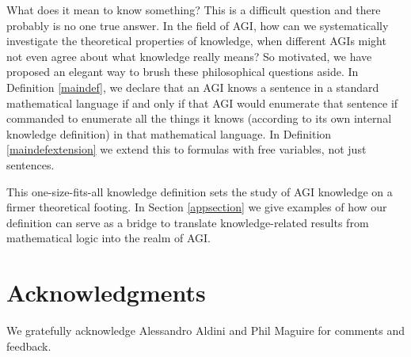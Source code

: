 \documentclass[runningheads]{llncs}
\begin{document}
What does it mean to know something? This is a difficult question and there probably
is no one true answer. In the field of AGI, how can we systematically investigate
the theoretical properties of knowledge, when different AGIs might not even agree
about what knowledge really means? So motivated, we have proposed
an elegant way to brush these philosophical questions aside. In Definition \ref{maindef},
we declare that an AGI knows a sentence in a standard mathematical language if and
only if that AGI would enumerate that sentence if commanded to enumerate all the
things it knows (according to its own internal knowledge definition) in that
mathematical language. In Definition \ref{maindefextension}
we extend this to formulas with free variables, not just sentences.

This one-size-fits-all knowledge definition sets the study of AGI knowledge
on a firmer theoretical footing. In Section \ref{appsection} we give examples
of how our definition can serve as a bridge to translate knowledge-related
results from mathematical logic into the realm of AGI.

\section*{Acknowledgments}

We gratefully acknowledge Alessandro Aldini and Phil Maguire for
comments and feedback.



\end{document}
